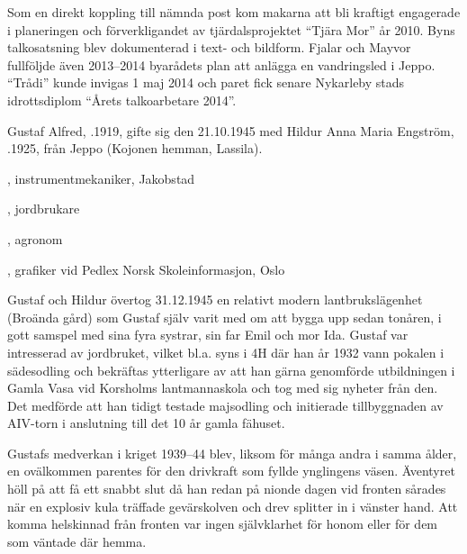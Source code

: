 Som en direkt koppling till nämnda post kom makarna att bli kraftigt engagerade i planeringen och förverkligandet av tjärdalsprojektet ``Tjära Mor'' år 2010. Byns talkosatsning blev dokumenterad i text- och bildform. Fjalar och Mayvor fullföljde även 2013--2014 byarådets plan att anlägga en vandringsled i Jeppo. ``Trådi'' kunde invigas 1 maj 2014 och paret fick senare Nykarleby stads idrottsdiplom ``Årets talkoarbetare 2014''.






Gustaf Alfred, .1919, gifte sig den 21.10.1945 med Hildur Anna Maria Engström, .1925, från Jeppo (Kojonen hemman, Lassila).
\begin{jhchildren}
  \item {}, instrumentmekaniker, Jakobstad
  \item {}, jordbrukare
  \item {}, agronom
  \item {}, grafiker vid Pedlex Norsk Skoleinformasjon, Oslo
\end{jhchildren}

Gustaf och Hildur övertog 31.12.1945 en relativt modern lantbrukslägenhet (Broända gård) som Gustaf själv varit med om att bygga upp sedan tonåren, i gott samspel med sina fyra systrar, sin far Emil och mor Ida. Gustaf var intresserad av jordbruket, vilket bl.a. syns i 4H där han år 1932 vann pokalen i sädesodling och bekräftas ytterligare av att han gärna genomförde utbildningen i Gamla Vasa vid 	Korsholms lantmannaskola och tog med sig nyheter från den. Det medförde att han tidigt testade majsodling och initierade tillbyggnaden av AIV-torn i anslutning till det 10 år gamla fähuset.

Gustafs medverkan i kriget 1939--44 blev, liksom för många andra i samma ålder, en ovälkommen parentes för den drivkraft som fyllde ynglingens väsen. Äventyret höll på att få ett snabbt slut då han redan på nionde dagen vid fronten sårades när en explosiv kula träffade gevärskolven och drev splitter in i vänster hand. Att komma helskinnad från fronten var ingen självklarhet för honom eller för dem som väntade där hemma.

